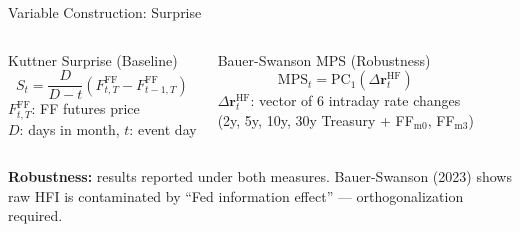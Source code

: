 \documentclass[aspectratio=169, 11pt]{beamer}
\begin{document}
\begin{frame}{Variable Construction: Surprise}
  \begin{columns}[T]
    \begin{ablock}{Kuttner Surprise (Baseline)}
      \begin{equation}
        S_t = \frac{D}{D-t}\left(F_{t,T}^{\mathrm{FF}} - F_{t-1,T}^{\mathrm{FF}}\right)
      \end{equation}
      \footnotesize
      $F_{t,T}^{\mathrm{FF}}$: FF futures price \\
      $D$: days in month, $t$: event day
    \end{ablock}

    \begin{aalertblock}{Bauer-Swanson MPS (Robustness)}
      \begin{equation}
        \mathrm{MPS}_t = \mathrm{PC}_1\!\left(\Delta \mathbf{r}_t^{\mathrm{HF}}\right)
      \end{equation}
      \footnotesize
      $\Delta \mathbf{r}_t^{\mathrm{HF}}$: vector of 6 intraday rate changes \\
      (2y, 5y, 10y, 30y Treasury + FF$_{\mathrm{m0}}$, FF$_{\mathrm{m3}}$)
    \end{aalertblock}
  \end{columns}

  \vspace{0.3em}
  \begin{center}
    \footnotesize
    \textbf{Robustness:} results reported under both measures. Bauer-Swanson (2023) shows raw HFI is contaminated by ``Fed information effect'' — orthogonalization required.
  \end{center}
\end{frame}
\end{document}

